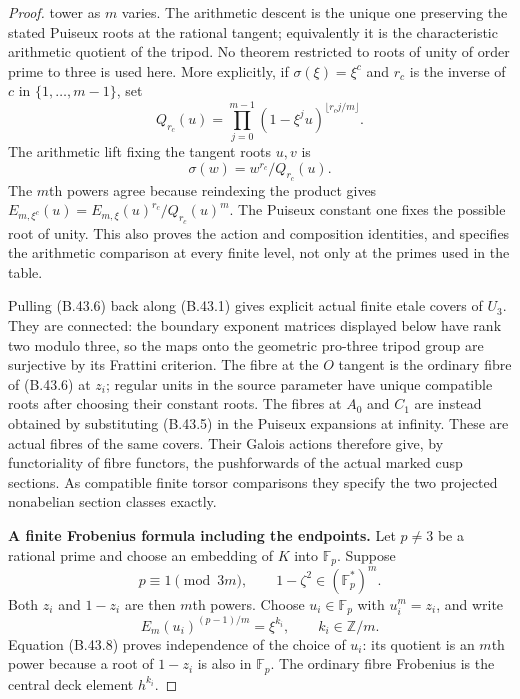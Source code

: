 \begin{proof}
tower as $m$ varies.  The arithmetic descent is the unique
one preserving the stated Puiseux roots at the rational
tangent; equivalently it is the characteristic arithmetic
quotient of the tripod.  No theorem restricted to roots of
unity of order prime to three is used here.
More explicitly, if $\sigma(\xi)=\xi^c$ and $r_c$ is the
inverse of $c$ in $\{1,\ldots,m-1\}$, set
\[
 Q_{r_c}(u)=\prod_{j=0}^{m-1}
          (1-\xi^ju)^{\lfloor r_cj/m\rfloor}.
\]
The arithmetic lift fixing the tangent roots $u,v$ is
\[
 \sigma(w)=w^{r_c}/Q_{r_c}(u).                             \tag{B.43.6a}
\]
The $m$th powers agree because reindexing the product
gives $E_{m,\xi^c}(u)=E_{m,\xi}(u)^{r_c}/Q_{r_c}(u)^m$.
The Puiseux constant one fixes the possible root of unity.
This also proves the action and composition identities,
and specifies the arithmetic comparison at every finite
level, not only at the primes used in the table.

Pulling (B.43.6) back along (B.43.1) gives explicit actual
finite etale covers of $U_3$.  They are connected: the
boundary exponent matrices displayed below have rank two
modulo three, so the maps onto the geometric pro-three
tripod group are surjective by its Frattini criterion.
The fibre at the $O$ tangent is the ordinary fibre of
(B.43.6) at $z_i$; regular units in the source parameter
have unique compatible roots after choosing their constant
roots.  The fibres at $A_0$ and $C_1$ are instead obtained
by substituting (B.43.5) in the Puiseux expansions at infinity.
These are actual fibres of the same covers.  Their Galois
actions therefore give, by functoriality of fibre functors,
the pushforwards of the actual marked cusp sections.
As compatible finite torsor comparisons they specify
the two projected nonabelian section classes exactly.

\par\smallskip\noindent\textbf{A finite Frobenius formula including the endpoints.}
Let $p\ne3$ be a rational prime and choose an embedding of
$K$ into $\mathbb F_p$.  Suppose
\[
 p\equiv1\pmod{3m},\qquad 1-\zeta^2\in(\mathbb F_p^*)^m.
                                                               \tag{B.43.10}
\]
Both $z_i$ and $1-z_i$ are then $m$th powers.  Choose
$u_i\in\mathbb F_p$ with $u_i^m=z_i$, and write
\[
 E_m(u_i)^{(p-1)/m}=\xi^{k_i},\qquad k_i\in\mathbb Z/m.
                                                               \tag{B.43.11}
\]
Equation (B.43.8) proves independence of the choice of
$u_i$: its quotient is an $m$th power because a root of
$1-z_i$ is also in $\mathbb F_p$.  The ordinary fibre
Frobenius is the central deck element $h^{k_i}$.


\end{proof}
